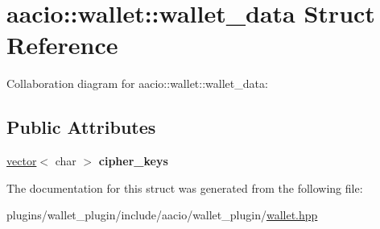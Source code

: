 \hypertarget{structaacio_1_1wallet_1_1wallet__data}{}\section{aacio\+:\+:wallet\+:\+:wallet\+\_\+data Struct Reference}
\label{structaacio_1_1wallet_1_1wallet__data}


Collaboration diagram for aacio\+:\+:wallet\+:\+:wallet\+\_\+data\+:
\subsection*{Public Attributes}
\begin{DoxyCompactItemize}
\item 
\mbox{\label{structaacio_1_1wallet_1_1wallet__data_ad098fbb7d655d8e4abc9306b69900b6a}} 
\mbox{\hyperlink{classstd_1_1vector}{vector}}$<$ char $>$ {\bfseries cipher\+\_\+keys}
\end{DoxyCompactItemize}


The documentation for this struct was generated from the following file\+:\begin{DoxyCompactItemize}
\item 
plugins/wallet\+\_\+plugin/include/aacio/wallet\+\_\+plugin/\mbox{\hyperlink{wallet_8hpp}{wallet.\+hpp}}\end{DoxyCompactItemize}
